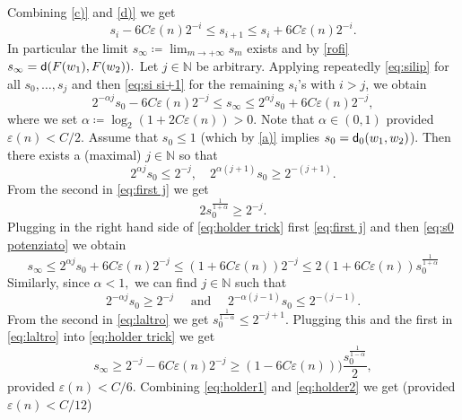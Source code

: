 \documentclass[11pt]{article}
\newcommand{\eps}{\varepsilon}
\newcommand{\nn}{\mathbb{N}}
\newcommand{\sfd}{{\sf d}}
\theoremstyle{plain}
\theoremstyle{definition}
\numberwithin{equation}{section}
\begin{document}
Combining \ref{c)} and \ref{d)} we get
\begin{equation}\label{eq:si si+1}
   s_i- 6C\eps(n)2^{-i}\le  s_{i+1}\le s_i+ 6C\eps(n)2^{-i}.
\end{equation}
In particular the limit $s_\infty\coloneqq \lim_{m\to +\infty} s_m$ exists and by \eqref{rofi} 
    $s_\infty=\sfd(F(w_1),F(w_2)).$
Let $j\in \nn$ be arbitrary. Applying repeatedly \eqref{eq:silip} for all $s_0,\dots,s_j$ and then \eqref{eq:si si+1} for the remaining $s_i$'s with $i>j$, we obtain
\begin{equation}\label{eq:holder trick}
   2^{-\alpha j} s_0 - 6C \eps(n)2^{-j}\le  s_\infty\le 2^{\alpha j} s_0 + 6C \eps(n)2^{-j},
\end{equation}
where we set $\alpha\coloneqq \log_2(1+2C \eps(n))>0.$ Note that $\alpha\in(0,1)$ provided $\eps(n)<C/2.$ Assume that $s_0\le 1$ (which by  \ref{a)} implies $s_0=\sfd_0(w_1,w_2)$).
Then there exists a (maximal) $j\in\nn$ so that 
\begin{equation} \label{eq:first j}
    2^{\alpha j}s_0\le 2^{-j}, \quad 2^{\alpha(j+1)}s_0\ge 2^{-(j+1)}.
\end{equation}
From the second in \eqref{eq:first j} we get
\begin{equation}\label{eq:s0 potenziato}
    2s_0^\frac{1}{1+\alpha}\ge 2^{-j}.
\end{equation}
Plugging in the right hand side of \eqref{eq:holder trick} first \eqref{eq:first j} and then \eqref{eq:s0 potenziato} we obtain
\begin{equation}\label{eq:holder1}
     s_\infty\le 2^{\alpha j} s_0 + 6C \eps(n)2^{-j}\le (1+6C \eps(n))2^{-j} \le 2(1+6C \eps(n))s_0^\frac{1}{1+\alpha}
\end{equation}
Similarly, since $\alpha<1,$ we can find $j\in \nn$ such that
\begin{equation}\label{eq:laltro}
    2^{-\alpha j}s_0\ge 2^{-j} \quad \text{ and } \quad 2^{-\alpha (j-1)}s_0\le 2^{-(j-1)}.
\end{equation}
From the second in \eqref{eq:laltro}  we get $s_0^\frac{1}{1-\alpha}\le 2^{-j+1}$.
Plugging this and the first in \eqref{eq:laltro} into \eqref{eq:holder trick} we get
\begin{equation}\label{eq:holder2}
     s_\infty\ge  2^{-j} - 6C \eps(n)2^{-j}\ge (1-6C \eps(n)))\frac{s_0^\frac{1}{1-\alpha}}2,
\end{equation}
provided $\eps(n)<C/6.$
Combining \eqref{eq:holder1} and \eqref{eq:holder2}  we get (provided $\eps(n)<C/12$)
\end{document}
